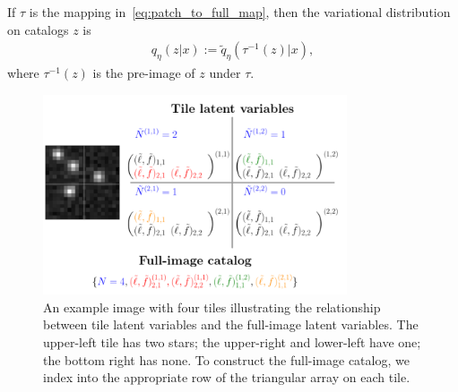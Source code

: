 If $\tau$ is the mapping in~\eqref{eq:patch_to_full_map}, then the variational distribution on catalogs $z$ is
\begin{align}
    q_\eta(z | x) := \tilde q_\eta(\tau^{-1}(z) | x),
    \label{eq:pull_back_of_q}
\end{align}
where $\tau^{-1}(z)$ is the pre-image of $z$ under $\tau$.







\begin{figure}[!tb]
    \centering
    \includegraphics[width = 0.8\textwidth]{figures/vi_figures/tile_to_full_schematic.png}
    \caption{An example image with four tiles illustrating the relationship between tile latent variables and the full-image latent variables. The upper-left tile has two stars; the upper-right and lower-left have one; the bottom right has none. 
    To construct the full-image catalog, we index into the appropriate row of the triangular array on each tile.}
    \label{fig:tile_to_full_schm}
\end{figure}


